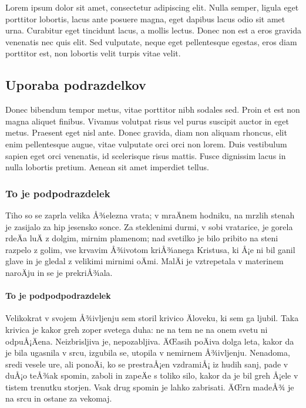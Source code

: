 \documentclass[a4paper]{article}
\begin{document}
Lorem ipsum dolor sit amet, consectetur adipiscing elit. Nulla semper, ligula eget
porttitor lobortis, lacus ante posuere magna, eget dapibus lacus odio sit amet urna.
Curabitur eget tincidunt lacus, a mollis lectus. Donec non est a eros gravida venenatis
nec quis elit. Sed vulputate, neque eget pellentesque egestas, eros diam porttitor est,
non lobortis velit turpis vitae velit.

\subsection{Uporaba podrazdelkov}

Donec bibendum tempor metus, vitae porttitor nibh sodales sed. Proin et est non magna
aliquet finibus. Vivamus volutpat risus vel purus suscipit auctor in eget metus. Praesent
eget nisl ante. Donec gravida, diam non aliquam rhoncus, elit enim pellentesque augue,
vitae vulputate orci orci non lorem. Duis vestibulum sapien eget orci venenatis, id
scelerisque risus mattis. Fusce dignissim lacus in nulla lobortis pretium. Aenean sit amet
imperdiet tellus.

\subsubsection{To je podpodrazdelek}

Tiho so se zaprla velika Å¾elezna vrata; v mraÄnem hodniku, na mrzlih stenah je zasijalo za
hip jesensko sonce. Za steklenimi durmi, v sobi vratarice, je gorela rdeÄa luÄ z dolgim,
mirnim plamenom; nad svetilko je bilo pribito na steni razpelo z golim, vse krvavim
Å¾ivotom kriÅ¾anega Kristusa, ki Å¡e ni bil ganil glave in je gledal z velikimi mirnimi oÄmi.
MalÄi je vztrepetala v materinem naroÄju in se je prekriÅ¾ala.

\paragraph{To je podpodpodrazdelek}

Velikokrat v svojem Å¾ivljenju sem storil krivico Äloveku, ki sem ga ljubil. Taka krivica
je kakor greh zoper svetega duha: ne na tem ne na onem svetu ni odpuÅ¡Äena. Neizbrisljiva
je, nepozabljiva. ÄŒasih poÄiva dolga leta, kakor da je bila ugasnila v srcu, izgubila se,
utopila v nemirnem Å¾ivljenju. Nenadoma, sredi vesele ure, ali ponoÄi, ko se prestraÅ¡en
vzdramiÅ¡ iz hudih sanj, pade v duÅ¡o teÅ¾ak spomin, zaboli in zapeÄe s toliko silo, kakor da
je bil greh Å¡ele v tistem trenutku storjen. Vsak drug spomin je lahko zabrisati. ÄŒrn madeÅ¾
je na srcu in ostane za vekomaj.
\end{document}
